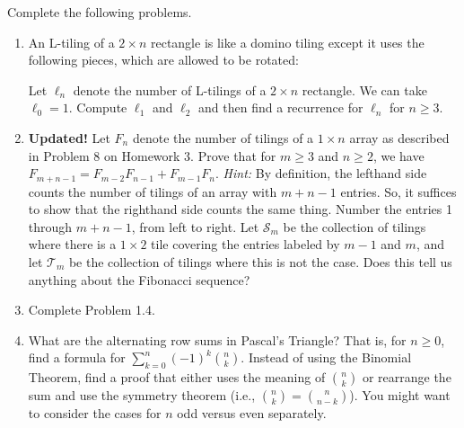 \documentclass[11pt]{article}%
\theoremstyle{definition}
\begin{document}
Complete the following problems. 
\begin{enumerate}
\item An L-tiling of a $2\times n$ rectangle is like a domino tiling except it uses the following pieces, which are allowed to be rotated:
\begin{center}
\hspace{1cm}
\end{center}
Let $\ell_n$ denote the number of L-tilings of a $2\times n$ rectangle.  We can take $\ell_0=1$.  Compute $\ell_1$ and $\ell_2$ and then find a recurrence for $\ell_n$ for $n\geq 3$.
\item \textbf{Updated!} Let $F_n$ denote the number of tilings of a $1\times n$ array as described in Problem 8 on Homework 3.  Prove that for $m\geq 3$ and $n\geq 2$, we have $F_{m+n-1}=F_{m-2}F_{n-1}+F_{m-1}F_{n}$. \textit{Hint:} By definition, the lefthand side counts the number of tilings of an array with $m+n-1$ entries.  So, it suffices to show that the righthand side counts the same thing.  Number the entries 1 through $m+n-1$, from left to right. Let $\mathcal{S}_m$ be the collection of tilings where there is a $1\times 2$ tile covering the entries labeled by $m-1$ and $m$, and let $\mathcal{T}_m$ be the collection of tilings where this is not the case.  Does this tell us anything about the Fibonacci sequence?
\item Complete Problem 1.4.
\item What are the alternating row sums in Pascal's Triangle?  That is, for $n\geq 0$, find a formula for $\sum_{k=0}^{n}(-1)^k\binom{n}{k}$. Instead of using the Binomial Theorem, find a proof that either uses the meaning of $\binom{n}{k}$ or rearrange the sum and use the symmetry theorem (i.e., $\binom{n}{k}=\binom{n}{n-k}$). You might want to consider the cases for $n$ odd versus even separately.

\end{enumerate}
\end{document}
